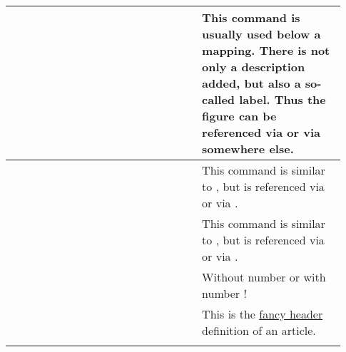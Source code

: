 \begin{footnotesize}
\begin{longtable}{ | P{0.53\linewidth} | p{0.4\linewidth} | }
        \hline
                                             &
        This command is usually used below a mapping. There is not only a
        description added, but also a so-called label. Thus the figure can be
        referenced via
        or via
        somewhere else.                                                                                      \\
        \hline
                                           &
        This command is similar to
        ,
        but is referenced via
         or via
        .                                              \\
        \hline
                                               &
        This command is similar to
        , but is
        referenced via
         or via
        .                                                \\
        \hline
                                                           &
        Without number \tsDegree{} or with number !                                            \\
        \hline
                                                         &
        This is the \href{https://ctan.org/pkg/fancyhdr}{fancy header} definition of an article.             \\
        \hline
                                                            &

\end{longtable}
\end{footnotesize}
